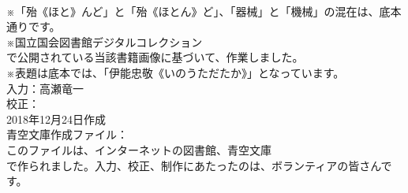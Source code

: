 \documentclass[8pt]{extreport}
\begin{document}
\begin{CJK}{UTF8}{min}
\\	※「殆《ほと》んど」と「殆《ほとん》ど」、「器械」と「機械」の混在は、底本通りです。
\\	※国立国会図書館デジタルコレクション
\\	で公開されている当該書籍画像に基づいて、作業しました。
\\	※表題は底本では、「伊能忠敬《いのうただたか》」となっています。
\\	入力：高瀬竜一
\\	校正：
\\	2018年12月24日作成
\\	青空文庫作成ファイル：
\\	このファイルは、インターネットの図書館、青空文庫
\\	で作られました。入力、校正、制作にあたったのは、ボランティアの皆さんです。
\end{CJK}
\end{document}
